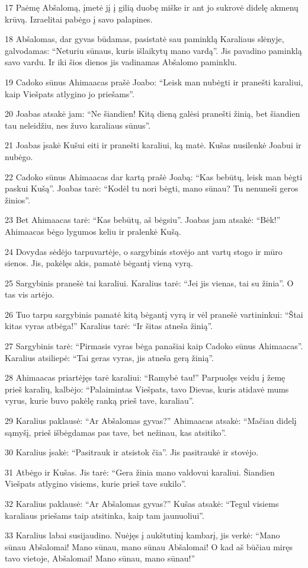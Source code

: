 \par 17 Paėmę Abšalomą, įmetė jį į gilią duobę miške ir ant jo sukrovė didelę akmenų krūvą. Izraelitai pabėgo į savo palapines. 
\par 18 Abšalomas, dar gyvas būdamas, pasistatė sau paminklą Karaliaus slėnyje, galvodamas: “Neturiu sūnaus, kuris išlaikytų mano vardą”. Jis pavadino paminklą savo vardu. Ir iki šios dienos jis vadinamas Abšalomo paminklu. 
\par 19 Cadoko sūnus Ahimaacas prašė Joabo: “Leisk man nubėgti ir pranešti karaliui, kaip Viešpats atlygino jo priešams”. 
\par 20 Joabas atsakė jam: “Ne šiandien! Kitą dieną galėsi pranešti žinią, bet šiandien tau neleidžiu, nes žuvo karaliaus sūnus”. 
\par 21 Joabas įsakė Kušui eiti ir pranešti karaliui, ką matė. Kušas nusilenkė Joabui ir nubėgo. 
\par 22 Cadoko sūnus Ahimaacas dar kartą prašė Joabą: “Kas bebūtų, leisk man bėgti paskui Kušą”. Joabas tarė: “Kodėl tu nori bėgti, mano sūnau? Tu nenuneši geros žinios”. 
\par 23 Bet Ahimaacas tarė: “Kas bebūtų, aš bėgsiu”. Joabas jam atsakė: “Bėk!” Ahimaacas bėgo lygumos keliu ir pralenkė Kušą. 
\par 24 Dovydas sėdėjo tarpuvartėje, o sargybinis stovėjo ant vartų stogo ir mūro sienos. Jis, pakėlęs akis, pamatė bėgantį vieną vyrą. 
\par 25 Sargybinis pranešė tai karaliui. Karalius tarė: “Jei jis vienas, tai su žinia”. O tas vis artėjo. 
\par 26 Tuo tarpu sargybinis pamatė kitą bėgantį vyrą ir vėl pranešė vartininkui: “Štai kitas vyras atbėga!” Karalius tarė: “Ir šitas atneša žinią”. 
\par 27 Sargybinis tarė: “Pirmasis vyras bėga panašiai kaip Cadoko sūnus Ahimaacas”. Karalius atsiliepė: “Tai geras vyras, jis atneša gerą žinią”. 
\par 28 Ahimaacas priartėjęs tarė karaliui: “Ramybė tau!” Parpuolęs veidu į žemę prieš karalių, kalbėjo: “Palaimintas Viešpats, tavo Dievas, kuris atidavė mums vyrus, kurie buvo pakėlę ranką prieš tave, karaliau”. 
\par 29 Karalius paklausė: “Ar Abšalomas gyvas?” Ahimaacas atsakė: “Mačiau didelį sąmyšį, prieš išbėgdamas pas tave, bet nežinau, kas atsitiko”. 
\par 30 Karalius įsakė: “Pasitrauk ir atsistok čia”. Jis pasitraukė ir stovėjo. 
\par 31 Atbėgo ir Kušas. Jis tarė: “Gera žinia mano valdovui karaliui. Šiandien Viešpats atlygino visiems, kurie prieš tave sukilo”. 
\par 32 Karalius paklausė: “Ar Abšalomas gyvas?” Kušas atsakė: “Tegul visiems karaliaus priešams taip atsitinka, kaip tam jaunuoliui”. 
\par 33 Karalius labai susijaudino. Nuėjęs į aukštutinį kambarį, jis verkė: “Mano sūnau Abšalomai! Mano sūnau, mano sūnau Abšalomai! O kad aš būčiau miręs tavo vietoje, Abšalomai! Mano sūnau, mano sūnau!”



